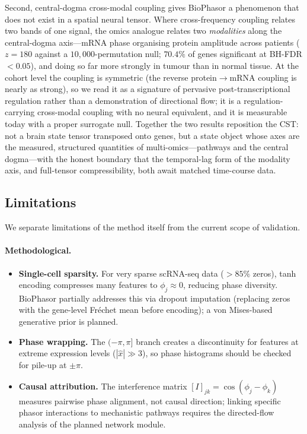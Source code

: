 \documentclass[preprint,12pt,amsmath,amssymb,superscriptaddress,floatfix]{revtex4-2}
\begin{document}
Second, central-dogma cross-modal coupling gives BioPhasor a phenomenon that
does not exist in a spatial neural tensor. Where cross-frequency coupling relates
two bands of one signal, the omics analogue relates two \emph{modalities} along
the central-dogma axis---mRNA phase organising protein amplitude across patients
($z=180$ against a $10{,}000$-permutation null; $70.4\%$ of genes significant at
BH-FDR $<0.05$), and doing so far more strongly in tumour than in normal tissue.
At the cohort level the coupling is symmetric (the reverse protein$\to$mRNA
coupling is nearly as strong), so we read it as a signature of pervasive
post-transcriptional regulation rather than a demonstration of directional flow;
it is a regulation-carrying cross-modal coupling with no neural equivalent, and
it is measurable today
with a proper surrogate null. Together the two results reposition the CST: not a
brain state tensor transposed onto genes, but a state object whose axes are the
measured, structured quantities of multi-omics---pathways and the central
dogma---with the honest boundary that the temporal-lag form of the modality axis,
and full-tensor compressibility, both await matched time-course data.

\subsection{Limitations}

We separate limitations of the method itself from the current scope of
validation.

\paragraph{Methodological.}
\begin{itemize}
    \item \textbf{Single-cell sparsity.} For very sparse scRNA-seq data
    ($>85\%$ zeros), tanh encoding compresses many features to
    $\phi_j \approx 0$, reducing phase diversity.
    BioPhasor partially addresses this via dropout imputation
    (replacing zeros with the gene-level Fr\'{e}chet mean before encoding);
    a von Mises-based generative prior is planned.

    \item \textbf{Phase wrapping.} The $(-\pi,\pi]$ branch creates a
    discontinuity for features at extreme expression levels ($|\hat{x}| \gg 3$),
    so phase histograms should be checked for pile-up at $\pm\pi$.

    \item \textbf{Causal attribution.} The interference matrix
    $[I]_{jk} = \cos(\phi_j-\phi_k)$ measures pairwise phase alignment, not
    causal direction; linking specific phasor interactions to mechanistic
    pathways requires the directed-flow analysis of the planned network
    module.
\end{itemize}
\end{document}
